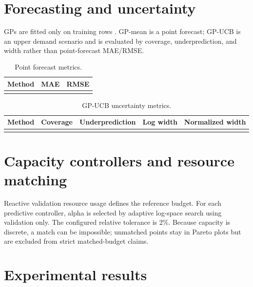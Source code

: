 \documentclass[10pt]{article}
\begin{document}
\section{Forecasting and uncertainty}
GPs are fitted only on training rows \cite{rasmussen2006}. GP-mean is a point forecast; GP-UCB is an upper demand scenario and is evaluated by coverage, underprediction, and width rather than point-forecast MAE/RMSE.
\begin{table}[!htbp]\centering\small\caption{Point forecast metrics.}\begin{tabular}{lrr}\toprule Method & MAE & RMSE\\\midrule
\\[2pt]\bottomrule\end{tabular}\end{table}
\begin{table}[!htbp]\centering\small\caption{GP-UCB uncertainty metrics.}\begin{tabular}{lrrrr}\toprule Method & Coverage & Underprediction & Log width & Normalized width\\\midrule
\\[2pt]\bottomrule\end{tabular}\end{table}
\section{Capacity controllers and resource matching}
Reactive validation resource usage defines the reference budget. For each predictive controller, alpha is selected by adaptive log-space search using validation only. The configured relative tolerance is 2\%. Because capacity is discrete, a match can be impossible; unmatched points stay in Pareto plots but are excluded from strict matched-budget claims.
\section{Experimental results}
\end{document}
